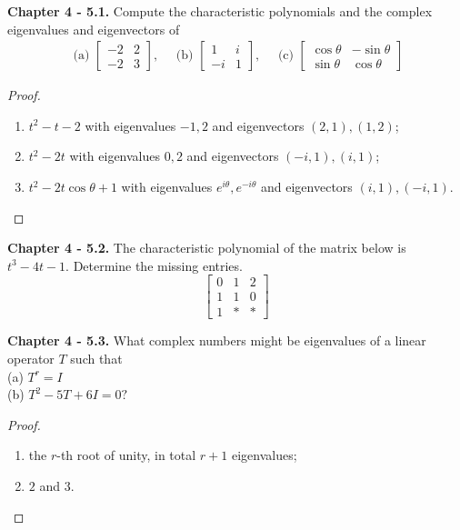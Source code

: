 \documentclass[10pt]{report}
\theoremstyle{definition}
\begin{document}
\textbf{Chapter 4 - 5.1.} Compute the characteristic polynomials and the complex eigenvalues and eigenvectors of
\[
\begin{array}{lll}
{\text { (a) }\left[\begin{array}{cc}
{-2} & {2} \\
{-2} & {3}
\end{array}\right], \quad \text { (b) }\left[\begin{array}{cc}
{1} & {i} \\
{-i} & {1}
\end{array}\right], \quad \text { (c) }\left[\begin{array}{cc}
{\cos \theta} & {-\sin \theta} \\
{\sin \theta} & {\cos \theta}
\end{array}\right]}
\end{array}
\]
\begin{proof}{}\leavevmode{}
\begin{enumerate}[label=(\alph*)]
\item $t^2-t-2$ with eigenvalues $-1,2$ and eigenvectors $(2,1),(1,2)$;
\item $t^2-2t$ with eigenvalues $0,2$ and eigenvectors $(-i,1),(i,1)$;
\item $t^2-2t\cos\theta+1$ with eigenvalues $e^{i\theta},e^{-i\theta}$ and eigenvectors $(i,1),(-i,1)$.
\end{enumerate}
\end{proof}

\colorbox{red!30}{\textbf{Chapter 4 - 5.2.}} The characteristic polynomial of the matrix below is $t^{3}-4 t-1 .$ Determine the missing entries.
\[
\left[\begin{array}{lll}
{0} & {1} & {2} \\
{1} & {1} & {0} \\
{1} & {*} & {*}
\end{array}\right]
\]

\textbf{Chapter 4 - 5.3.} What complex numbers might be eigenvalues of a linear operator $T$ such that\\
(a) $T^{r}=I$\\
(b) $T^{2}-5 T+6 I=0 ?$
\begin{proof}{}\leavevmode{}
\begin{enumerate}[label=(\alph*)]
\item the $r$-th root of unity, in total $r+1$ eigenvalues;
\item $2$ and $3$.
\end{enumerate}
\end{proof}
\end{document}
